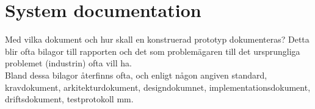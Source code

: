 \section{System documentation}
\begin{swedishnotes}
	Med vilka dokument och hur skall en konstruerad prototyp dokumenteras? Detta blir ofta bilagor till rapporten och det som problemägaren till det ursprungliga problemet (industrin) ofta vill ha.\\
	Bland dessa bilagor återfinns ofta, och enligt någon angiven standard, kravdokument, arkitekturdokument, designdokumnet, implementationsdokument, driftsdokument, testprotokoll mm.
\end{swedishnotes}
